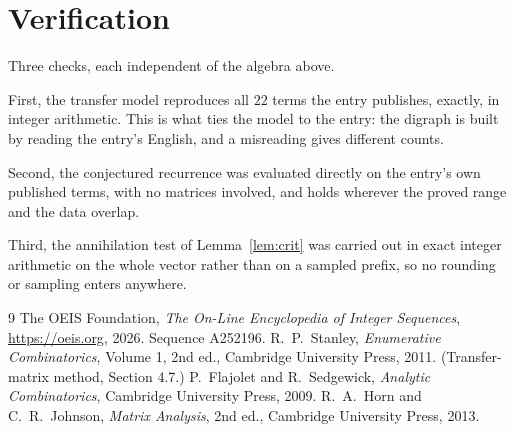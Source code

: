 \documentclass[11pt,a4paper]{article}
\theoremstyle{plain}
\theoremstyle{definition}
\begin{document}
\section{Verification}

Three checks, each independent of the algebra above.

First, the transfer model reproduces all $22$ terms the entry publishes, exactly, in
integer arithmetic. This is what ties the model to the entry: the digraph is built by reading
the entry's English, and a misreading gives different counts.

Second, the conjectured recurrence was evaluated directly on the entry's own published terms,
with no matrices involved, and holds wherever the proved range and the data overlap.

Third, the annihilation test of Lemma~\ref{lem:crit} was carried out in exact integer
arithmetic on the whole vector rather than on a sampled prefix, so no rounding or sampling
enters anywhere.

\begin{thebibliography}{9}
 The OEIS Foundation, \emph{The On-Line Encyclopedia of Integer
Sequences}, \url{https://oeis.org}, 2026. Sequence A252196.
 R.~P.~Stanley, \emph{Enumerative Combinatorics}, Volume 1, 2nd ed.,
Cambridge University Press, 2011. (Transfer-matrix method, Section 4.7.)
 P.~Flajolet and R.~Sedgewick, \emph{Analytic Combinatorics}, Cambridge
University Press, 2009.
 R.~A.~Horn and C.~R.~Johnson, \emph{Matrix Analysis}, 2nd ed., Cambridge
University Press, 2013.
\end{thebibliography}
\end{document}
